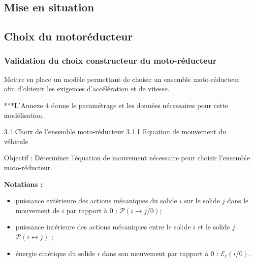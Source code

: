 \documentclass[10pt,fleqn]{article} %
\begin{document}

\vspace{4.5cm}
\pagestyle{fancy}
\thispagestyle{plain}


\def\columnseprulecolor{\color{ocre}}
\setlength{\columnseprule}{0.4pt} 

\begin{multicols}{2}
\section*{Mise en situation}
\ifprof
\else

\begin{center}
\end{center}

\fi

\subsection*{Choix du motoréducteur}

\subsubsection*{Validation du choix constructeur du moto-réducteur}
\begin{obj}
Mettre en place un modèle permettant de choisir un ensemble moto-réducteur afin d’obtenir les
exigences d’accélération et de vitesse.
\end{obj}

***L’Annexe 4 donne le paramétrage et les données nécessaires pour cette modélisation.


3.1 Choix de l’ensemble moto-réducteur
3.1.1 Equation de mouvement du véhicule
\begin{obj}
Objectif : Déterminer l’équation de mouvement nécessaire pour choisir l’ensemble moto-réducteur.
\end{obj}

\textbf{Notations :}
\begin{itemize}
\item puissance extérieure des actions mécaniques du solide $i$ sur le solide $j$ dans le mouvement de $i$ par rapport à 0 : $\mathcal{P}\left( i \to j / 0\right)$;
\item puissance intérieure des actions mécaniques entre le solide $i$ et le solide $j$: $\mathcal{P}\left( i \leftrightarrow j\right)$ ;
\item énergie cinétique du solide $i$ dans son mouvement par rapport à 0 : $\mathcal{E}_c\left(i/0\right)$.
\end{itemize}


\end{multicols}
\end{document}
